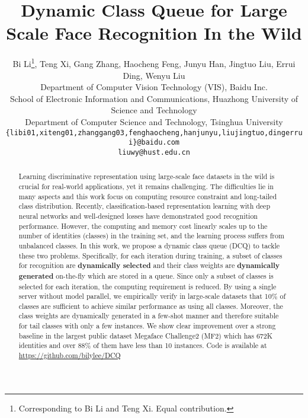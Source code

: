 \documentclass[10pt,twocolumn,letterpaper]{article}
\begin{document}
\title{Dynamic Class Queue for Large Scale Face Recognition In the Wild}

\author{Bi Li\thanks{Corresponding to Bi Li and Teng Xi. Equal contribution.},  
	Teng Xi, 
	Gang Zhang, 
	Haocheng Feng, 
	Junyu Han,
	Jingtuo Liu,
    Errui Ding,
    Wenyu Liu \\
    Department of Computer Vision
Technology (VIS), Baidu Inc.\\
	School of Electronic Information and Communications, Huazhong University of Science and Technology\\
	Department of Computer Science and Technology, Tsinghua University\\
	\tt\small{\{libi01,xiteng01,zhanggang03,fenghaocheng,hanjunyu,liujingtuo,dingerrui\}@baidu.com}\\
	\tt\small{liuwy@hust.edu.cn}}

\maketitle
\thispagestyle{empty}

\begin{abstract}
   Learning discriminative representation using large-scale face datasets in the wild is crucial for real-world applications, yet it remains challenging. The difficulties lie in many aspects and this work focus on computing resource constraint and long-tailed class distribution. Recently, classification-based representation learning with deep neural networks and well-designed losses have demonstrated good recognition performance. However, the computing and memory cost linearly scales up to the number of identities (classes) in the training set, and the learning process suffers from unbalanced classes. In this work, we propose a dynamic class queue (DCQ) to tackle these two problems. Specifically, for each iteration during training, a subset of classes for recognition are \textbf{dynamically selected} and their class weights are \textbf{dynamically generated} on-the-fly which are stored in a queue. Since only a subset of classes is selected for each iteration, the computing requirement is reduced. By using a single server without model parallel, we empirically verify in large-scale datasets that 10\% of classes are sufficient to achieve similar performance as using all classes. Moreover, the class weights are dynamically generated in a few-shot manner and therefore suitable for tail classes with only a few instances. We show clear improvement over a strong baseline in the largest public dataset Megaface Challenge2 (MF2) which has 672K identities and over 88\% of them have less than 10 instances. Code is available at \url{https://github.com/bilylee/DCQ}

\end{abstract}
\end{document}
